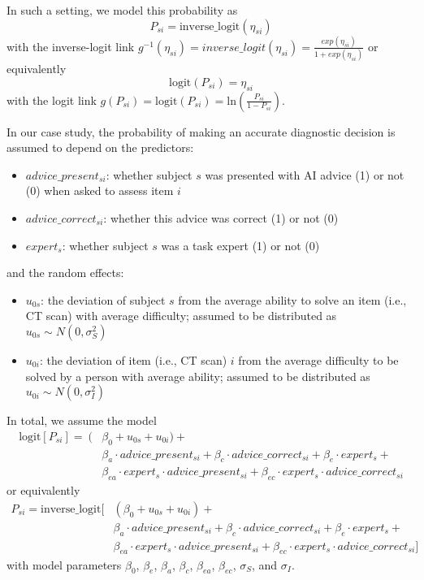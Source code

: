 \documentclass[
  man,floatsintext]{apa6}
\providecommand{\tightlist}{%
  \setlength{\itemsep}{0pt}\setlength{\parskip}{0pt}}
\begin{document}
In such a setting, we model this probability as
\[
P_{si} = \text{inverse\_logit}(\eta_{si})
\]
with the inverse-logit link \(g^{-1}(\eta_{si}) = inverse\_logit(\eta_{si}) = \frac{exp(\eta_{si})}{1 + exp(\eta_{si})}\) or equivalently
\[
\text{logit}(P_{si}) = \eta_{si}
\]
with the logit link \(g(P_{si}) = \text{logit}(P_{si}) = \text{ln} (\frac{P_{si}}{1 - P_{si}})\).

In our case study, the probability of making an accurate diagnostic decision is assumed to depend on the predictors:

\begin{itemize}
\tightlist
\item
  \(advice\_present_{si}\): whether subject \(s\) was presented with AI advice (1) or not (0) when asked to assess item \(i\)
\item
  \(advice\_correct_{si}\): whether this advice was correct (1) or not (0)
\item
  \(expert_s\): whether subject \(s\) was a task expert (1) or not (0)
\end{itemize}

and the random effects:

\begin{itemize}
\tightlist
\item
  \(u_{0s}\): the deviation of subject \(s\) from the average ability to solve an item (i.e., CT scan) with average difficulty; assumed to be distributed as \(u_{0s} \sim N(0, \sigma_S^2)\)
\item
  \(u_{0i}\): the deviation of item (i.e., CT scan) \(i\) from the average difficulty to be solved by a person with average ability; assumed to be distributed as \(u_{0i} \sim N(0, \sigma_I^2)\)
\end{itemize}

In total, we assume the model
\[
\begin{aligned}
\text{logit}[P_{si}] =\ (&\beta_0 + u_{0s} + u_{0i}) + \\
&\beta_a \cdot advice\_present_{si} + \beta_c \cdot advice\_correct_{si} + \beta_e \cdot expert_s + \\
&\beta_{ea} \cdot expert_{s} \cdot advice\_present_{si} + \beta_{ec} \cdot expert_{s} \cdot advice\_correct_{si}
\end{aligned}
\]
or equivalently
\[
\begin{aligned}
P_{si} = \text{inverse\_logit}[&(\beta_0 + u_{0s} + u_{0i}) + \\
&\beta_a \cdot advice\_present_{si} + \beta_c \cdot advice\_correct_{si} + \beta_e \cdot expert_s + \\
&\beta_{ea} \cdot expert_{s} \cdot advice\_present_{si} + \beta_{ec} \cdot expert_{s} \cdot advice\_correct_{si}]
\end{aligned}
\]
with model parameters \(\beta_0\), \(\beta_e\), \(\beta_a\), \(\beta_c\), \(\beta_{ea}\), \(\beta_{ec}\), \(\sigma_S\), and \(\sigma_I\).
\end{document}
